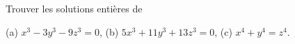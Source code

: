 Trouver les solutions entières de

(a) $x^3 - 3y^3 - 9z^3 = 0$, (b) $5x^3 + 11y^3 + 13z^3 = 0$, (c) $x^4 + y^4 = z^4$.
